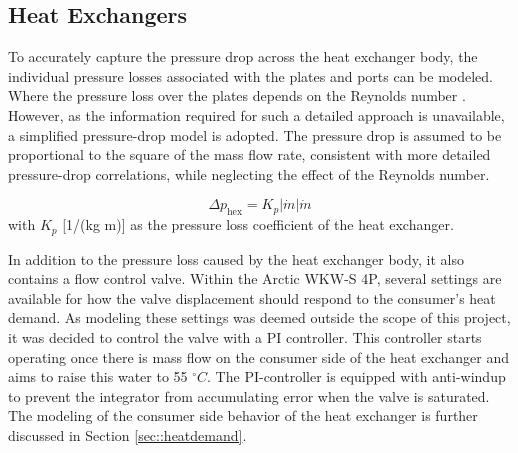 
\subsection{Heat Exchangers}\label{sec:::hydroHEX}
To accurately capture the pressure drop across the heat exchanger body, the individual pressure losses associated with the plates and ports can be modeled. Where the pressure loss over the plates depends on the Reynolds number \cite{FemkeJanssenLit}. However, as the information required for such a detailed approach is unavailable, a simplified pressure-drop model is adopted. The pressure drop is assumed to be proportional to the square of the mass flow rate, consistent with more detailed pressure-drop correlations, while neglecting the effect of the Reynolds number.

\begin{equation}
    \Delta p_{\text{hex}} = K_p |\dot{m}| \dot{m}
\end{equation}
with $K_p$ [1/(kg m)] as the pressure loss coefficient of the heat exchanger.

In addition to the pressure loss caused by the heat exchanger body, it also contains a flow control valve. Within the Arctic WKW-S 4P, several settings are available for how the valve displacement should respond to the consumer's heat demand. As modeling these settings was deemed outside the scope of this project, it was decided to control the valve with a PI controller. This controller starts operating once there is mass flow on the consumer side of the heat exchanger and aims to raise this water to 55 $^{\circ}C$. The PI-controller is equipped with anti-windup to prevent the integrator from accumulating error when the valve is saturated. The modeling of the consumer side behavior of the heat exchanger is further discussed in Section \ref{sec::heatdemand}.


